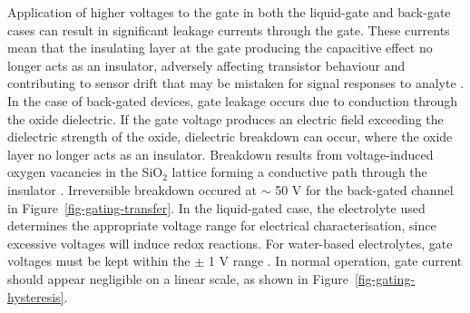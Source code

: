 \documentclass[
  a4paper,
]{scrbook}
\begin{document}
Application of higher voltages to the gate in both the liquid-gate and
back-gate cases can result in significant leakage currents through the
gate. These currents mean that the insulating layer at the gate
producing the capacitive effect no longer acts as an insulator,
adversely affecting transistor behaviour and contributing to sensor
drift that may be mistaken for signal responses to analyte
\autocite{Noyce2019,Shkodra2021,Albarghouthi2022}. In the case of
back-gated devices, gate leakage occurs due to conduction through the
oxide dielectric. If the gate voltage produces an electric field
exceeding the dielectric strength of the oxide, dielectric breakdown can
occur, where the oxide layer no longer acts as an insulator. Breakdown
results from voltage-induced oxygen vacancies in the SiO\(_2\) lattice
forming a conductive path through the insulator \autocite{Padovani2017}.
Irreversible breakdown occured at \(\sim\) 50 V for the back-gated
channel in Figure~\ref{fig-gating-transfer}. In the liquid-gated case,
the electrolyte used determines the appropriate voltage range for
electrical characterisation, since excessive voltages will induce redox
reactions. For water-based electrolytes, gate voltages must be kept
within the \(\pm\) 1 V range \autocite{Wang2010,Ohno2015,Shkodra2021}.
In normal operation, gate current should appear negligible on a linear
scale, as shown in Figure~\ref{fig-gating-hysteresis}.
\end{document}
